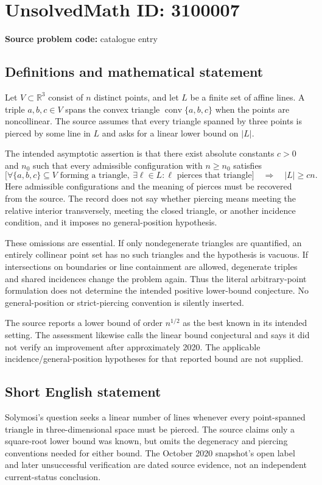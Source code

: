 \documentclass[11pt]{article}
\newcommand{\R}{\mathbb{R}}
\begin{document}
\section*{UnsolvedMath ID: 3100007}
\textbf{Source problem code:} catalogue entry
\subsection{Definitions and mathematical statement}
Let $V\subset\R^3$ consist of $n$ distinct points, and let $L$ be a finite set of affine lines. A triple $a,b,c\in V$ spans the convex triangle $\operatorname{conv}\{a,b,c\}$ when the points are noncollinear. The source assumes that every triangle spanned by three points is pierced by some line in $L$ and asks for a linear lower bound on $|L|$.

The intended asymptotic assertion is that there exist absolute constants $c>0$ and $n_0$ such that every admissible configuration with $n\geq n_0$ satisfies
\[
 \bigl[\forall\{a,b,c\}\subseteq V\text{ forming a triangle},\ 
 \exists\ell\in L:\ell\text{ pierces that triangle}\bigr]
 \quad\Longrightarrow\quad |L|\geq cn.
\]
Here admissible configurations and the meaning of pierces must be recovered from the source. The record does not say whether piercing means meeting the relative interior transversely, meeting the closed triangle, or another incidence condition, and it imposes no general-position hypothesis.

These omissions are essential. If only nondegenerate triangles are quantified, an entirely collinear point set has no such triangles and the hypothesis is vacuous. If intersections on boundaries or line containment are allowed, degenerate triples and shared incidences change the problem again. Thus the literal arbitrary-point formulation does not determine the intended positive lower-bound conjecture. No general-position or strict-piercing convention is silently inserted.

The source reports a lower bound of order $n^{1/2}$ as the best known in its intended setting. The assessment likewise calls the linear bound conjectural and says it did not verify an improvement after approximately 2020. The applicable incidence/general-position hypotheses for that reported bound are not supplied.
\subsection{Short English statement}
Solymosi's question seeks a linear number of lines whenever every point-spanned triangle in three-dimensional space must be pierced. The source claims only a square-root lower bound was known, but omits the degeneracy and piercing conventions needed for either bound. The October 2020 snapshot's open label and later unsuccessful verification are dated source evidence, not an independent current-status conclusion.
\end{document}

